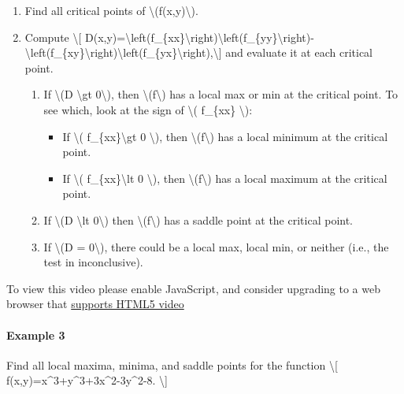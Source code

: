 \begin{enumerate}
\item
  Find all critical points of \textbackslash{}(f(x,y)\textbackslash{}).
\item
  Compute \textbackslash{}{[}
  D(x,y)=\textbackslash{}left(f\_\{xx\}\textbackslash{}right)\textbackslash{}left(f\_\{yy\}\textbackslash{}right)-\textbackslash{}left(f\_\{xy\}\textbackslash{}right)\textbackslash{}left(f\_\{yx\}\textbackslash{}right),\textbackslash{}{]}
  and evaluate it at each critical point.

  \begin{enumerate}
  \item
    If \textbackslash{}(D \textbackslash{}gt 0\textbackslash{}), then
    \textbackslash{}(f\textbackslash{}) has a local max or min at the
    critical point. To see which, look at the sign of \textbackslash{}(
    f\_\{xx\} \textbackslash{}):

    \begin{itemize}
    \tightlist
    \item
      If \textbackslash{}( f\_\{xx\}\textbackslash{}gt 0
      \textbackslash{}), then \textbackslash{}(f\textbackslash{}) has a
      local minimum at the critical point.
    \item
      If \textbackslash{}( f\_\{xx\}\textbackslash{}lt 0
      \textbackslash{}), then \textbackslash{}(f\textbackslash{}) has a
      local maximum at the critical point.
    \end{itemize}
  \item
    If \textbackslash{}(D \textbackslash{}lt 0\textbackslash{}) then
    \textbackslash{}(f\textbackslash{}) has a saddle point at the
    critical point.
  \item
    If \textbackslash{}(D = 0\textbackslash{}), there could be a local
    max, local min, or neither (i.e., the test in inconclusive).
  \end{enumerate}
\end{enumerate}

To view this video please enable JavaScript, and consider upgrading to a
web browser that \href{http://videojs.com/html5-video-support/}{supports
HTML5 video}

\hypertarget{example-3}{%
\paragraph{Example 3}\label{example-3}}

Find all local maxima, minima, and saddle points for the function
\textbackslash{}{[} f(x,y)=x\^{}3+y\^{}3+3x\^{}2-3y\^{}2-8.
\textbackslash{}{]}

